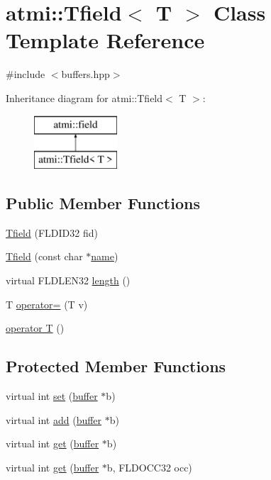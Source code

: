 \hypertarget{classatmi_1_1_tfield}{}\section{atmi\+:\+:Tfield$<$ T $>$ Class Template Reference}
\label{classatmi_1_1_tfield}


{\ttfamily \#include $<$buffers.\+hpp$>$}

Inheritance diagram for atmi\+:\+:Tfield$<$ T $>$\+:\begin{figure}[H]
\begin{center}
\leavevmode
\includegraphics[height=2.000000cm]{classatmi_1_1_tfield}
\end{center}
\end{figure}
\subsection*{Public Member Functions}
\begin{DoxyCompactItemize}
\item 
\hyperlink{classatmi_1_1_tfield_a7bf54162e43037ffb34692409d45241b}{Tfield} (F\+L\+D\+I\+D32 fid)
\item 
\hyperlink{classatmi_1_1_tfield_a9718a2fcffa95fda6e31f18815d05dbe}{Tfield} (const char $\ast$\hyperlink{classatmi_1_1field_a0fbc5a958a0af8286e339b088ee69bc8}{name})
\item 
virtual F\+L\+D\+L\+E\+N32 \hyperlink{classatmi_1_1_tfield_a6138c508841c4a837ea8c8e089755278}{length} ()
\item 
T \hyperlink{classatmi_1_1_tfield_a7903e881d35805b1477b1ef8f2928f4e}{operator=} (T v)
\item 
\hyperlink{classatmi_1_1_tfield_ad8b13cf9dc43ad4a896ab96a1aefb31f}{operator T} ()
\end{DoxyCompactItemize}
\subsection*{Protected Member Functions}
\begin{DoxyCompactItemize}
\item 
virtual int \hyperlink{classatmi_1_1_tfield_ae1da3af2b09c0259de11e5f334f75ce0}{set} (\hyperlink{classatmi_1_1buffer}{buffer} $\ast$b)
\item 
virtual int \hyperlink{classatmi_1_1_tfield_a46dfca85173035aad4c6adb48ba46959}{add} (\hyperlink{classatmi_1_1buffer}{buffer} $\ast$b)
\item 
virtual int \hyperlink{classatmi_1_1_tfield_a4c541818b9e62e2a9f872eb3c2724a04}{get} (\hyperlink{classatmi_1_1buffer}{buffer} $\ast$b)
\item 
virtual int \hyperlink{classatmi_1_1_tfield_acf705d624909bfb959e8229b91819701}{get} (\hyperlink{classatmi_1_1buffer}{buffer} $\ast$b, F\+L\+D\+O\+C\+C32 occ)
\end{DoxyCompactItemize}
